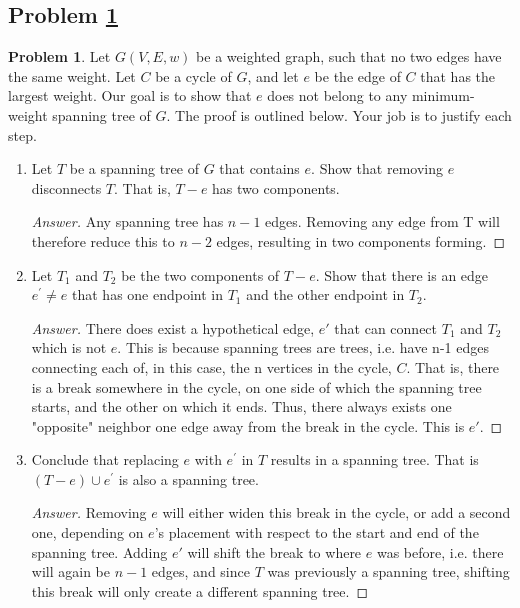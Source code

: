 \documentclass[11pt]{article}
\theoremstyle{definition}
\theoremstyle{definition}
\newtheorem{required}{Problem}
\theoremstyle{definition}
\begin{document}
\newpage
\subsection{Problem \ref{Safe3}}
\begin{required} \label{Safe3}
Let $G(V, E, w)$ be a weighted graph, such that no two edges have the same weight. Let $C$ be a cycle of $G$, and let $e$ be the edge of $C$ that has the largest weight. Our goal is to show that $e$ does not belong to any minimum-weight spanning tree of $G$. The proof is outlined below. Your job is to justify each step.
\begin{enumerate}[label=(\alph*)]
\item Let $T$ be a spanning tree of $G$ that contains $e$. Show that removing $e$ disconnects $T$. That is, $T - e$ has two components. 

\begin{proof}[Answer]

Any spanning tree has $n-1$ edges. Removing any edge from T will therefore reduce this to $n-2$ edges, resulting in two components forming.

\end{proof}


\vskip 20pt
\item Let $T_{1}$ and $T_{2}$ be the two components of $T - e$. Show that there is an edge $e^{\prime} \neq e$ that has one endpoint in $T_{1}$ and the other endpoint in $T_{2}$.

\begin{proof}[Answer]

There does exist a hypothetical edge, $e\prime$ that can connect $T_1$ and $T_2$ which is not $e$. This is because spanning trees are trees, i.e. have n-1 edges connecting each of, in this case, the n vertices in the cycle, $C$. That is, there is a break somewhere in the cycle, on one side of which the spanning tree starts, and the other on which it ends. Thus, there always exists one "opposite" neighbor one edge away from the break in the cycle. This is $e\prime$. 
\end{proof}



\vskip 20pt
\item Conclude that replacing $e$ with $e^{\prime}$ in $T$ results in a spanning tree. That is $(T - e) \cup e^{\prime}$ is also a spanning tree.
\begin{proof}[Answer]
Removing $e$ will either widen this break in the cycle, or add a second one, depending on $e$'s placement with respect to the start and end of the spanning tree. Adding $e\prime$ will shift the break to where $e$ was before, i.e. there will again be $n-1$ edges, and since $T$ was previously a spanning tree, shifting this break will only create a different spanning tree. 
\end{proof}




\end{enumerate}
\end{required}
\end{document}
